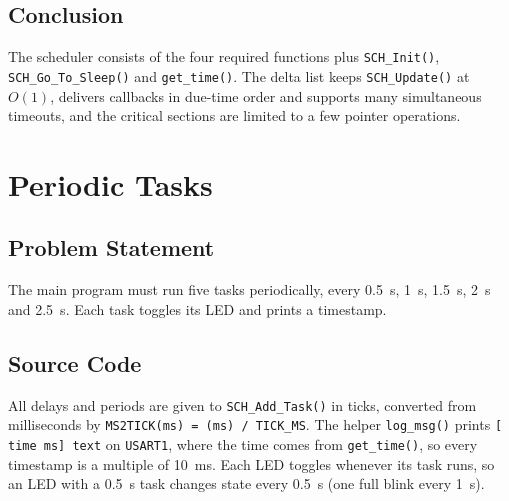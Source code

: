\documentclass[twoside,final]{hcmut-report}
\begin{document}
\subsection{Conclusion}
The scheduler consists of the four required functions plus \texttt{SCH\_Init()}, \texttt{SCH\_Go\_To\_Sleep()} and \texttt{get\_time()}. The delta list keeps \texttt{SCH\_Update()} at $O(1)$, delivers callbacks in due-time order and supports many simultaneous timeouts, and the critical sections are limited to a few pointer operations.

\section{Periodic Tasks}
\subsection{Problem Statement}
The main program must run five tasks periodically, every 0.5~s, 1~s, 1.5~s, 2~s and 2.5~s. Each task toggles its LED and prints a timestamp.

\subsection{Source Code}
All delays and periods are given to \texttt{SCH\_Add\_Task()} in ticks, converted from milliseconds by \texttt{MS2TICK(ms) = (ms) / TICK\_MS}. The helper \texttt{log\_msg()} prints \texttt{[ time ms] text} on \texttt{USART1}, where the time comes from \texttt{get\_time()}, so every timestamp is a multiple of 10~ms. Each LED toggles whenever its task runs, so an LED with a 0.5~s task changes state every 0.5~s (one full blink every 1~s).
\end{document}
